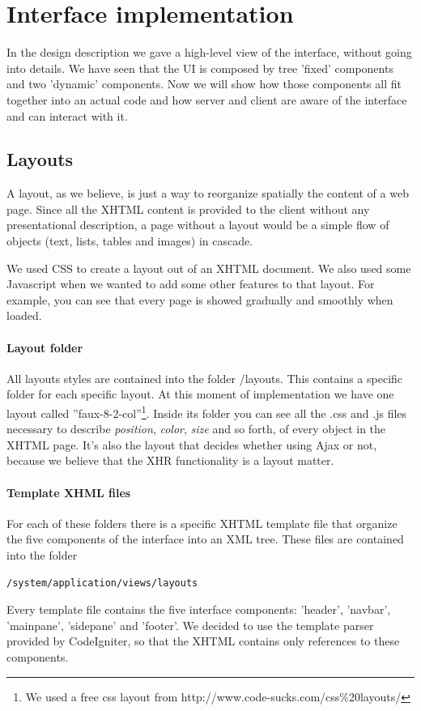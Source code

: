 \documentclass[12pt]{report}
\begin{document}
\section{Interface implementation}
In the design description we gave a high-level view of the interface, without going into details. We have seen that the UI is composed by tree 'fixed' components and two 'dynamic' components. Now we will show how those components all fit together into an actual code and how server and client are aware of the interface and can interact with it.

\subsection{Layouts}
A layout, as we believe, is just a way to reorganize spatially the content of a web page. Since all the XHTML content is provided to the client without any presentational description, a page without a layout would be a simple flow of objects (text, lists, tables and images) in cascade.

We used CSS to create a layout out of an XHTML document. We also used some Javascript when we wanted to add some other features to that layout. For example, you can see that every page is showed gradually and smoothly when loaded.

\paragraph{Layout folder}
All layouts styles are contained into the folder /layouts. This contains a specific folder for each specific layout. At this moment of implementation we have one layout called ''faux-8-2-col''\footnote{We used a free css layout from http://www.code-sucks.com/css\%20layouts/}. Inside its folder you can see all the .css and .js files necessary to describe \emph{position}, \emph{color}, \emph{size} and so forth, of every object in the XHTML page. It's also the layout that decides whether using Ajax or not, because we believe that the XHR functionality is a layout matter.

\paragraph{Template XHML files}
For each of these folders there is a specific XHTML template file that organize the five components of the interface into an XML tree. These files are contained into the folder
\begin{verbatim}
/system/application/views/layouts
\end{verbatim}
Every template file contains the five interface components: 'header', 'navbar', 'mainpane', 'sidepane' and 'footer'. We decided to use the template parser provided by CodeIgniter, so that the XHTML contains only references to these components.
\end{document}
